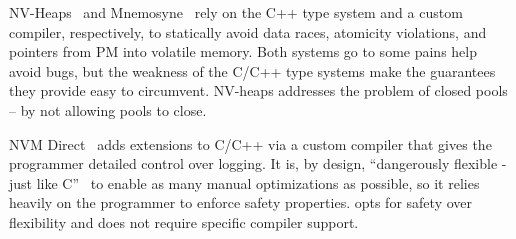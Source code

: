 NV-Heaps~\cite{nvheaps} and Mnemosyne~\cite{mnemosyne} rely on the C++ type system and a custom compiler, respectively, to statically avoid data races, atomicity violations, and pointers from PM into volatile memory.  Both systems go to some pains help avoid bugs, but the weakness of the C/C++ type systems make the guarantees they provide easy to circumvent.  NV-heaps addresses the problem of closed pools -- by not allowing pools to close.

NVM Direct~\cite{oracle-nvm-direct} adds extensions to C/C++ via a custom compiler that gives the programmer detailed control over logging.  It is, by design, ``dangerously flexible - just like C''~\cite{personalbillbridge} to enable as many manual optimizations as possible, so it relies heavily on the programmer to enforce safety properties.  \This{} opts for safety over flexibility and does not require specific compiler support.






